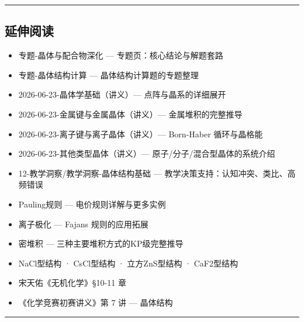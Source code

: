 \documentclass[a4paper,11pt]{ctexart}
\providecommand{\tightlist}{\setlength{\itemsep}{0pt}\setlength{\parskip}{0pt}}
\begin{document}
\begin{center}\rule{0.5\linewidth}{0.5pt}\end{center}

\subsection{延伸阅读}\label{ux5ef6ux4f38ux9605ux8bfb}

\begin{itemize}
\tightlist
\item
  专题-晶体与配合物深化 --- 专题页：核心结论与解题套路
\item
  专题-晶体结构计算 --- 晶体结构计算题的专题整理
\item
  2026-06-23-晶体学基础（讲义）--- 点阵与晶系的详细展开
\item
  2026-06-23-金属键与金属晶体（讲义）--- 金属堆积的完整推导
\item
  2026-06-23-离子键与离子晶体（讲义）--- Born-Haber 循环与晶格能
\item
  2026-06-23-其他类型晶体（讲义）--- 原子/分子/混合型晶体的系统介绍
\item
  12-教学洞察/教学洞察-晶体结构基础 --- 教学决策支持：认知冲突、类比、高频错误
\item
  Pauling规则 --- 电价规则详解与更多实例
\item
  离子极化 --- Fajans 规则的应用拓展
\item
  密堆积 --- 三种主要堆积方式的KP级完整推导
\item
  NaCl型结构 · CsCl型结构 · 立方ZnS型结构 · CaF2型结构
\item
  宋天佑《无机化学》§10-11 章
\item
  《化学竞赛初赛讲义》第 7 讲 --- 晶体结构
\end{itemize}

\begin{center}\rule{0.5\linewidth}{0.5pt}\end{center}
\end{document}
